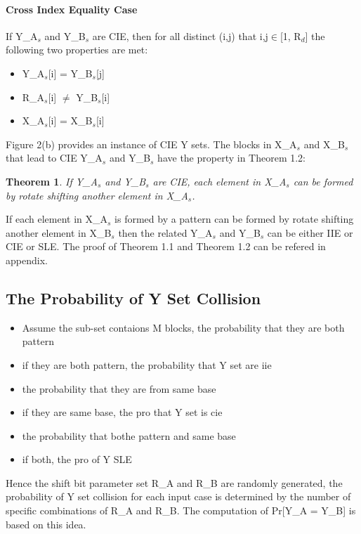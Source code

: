 \documentclass{article}
\newtheorem{theorem}{Theorem}[section]
\begin{document}
\paragraph{Cross Index Equality Case}
If Y\_A$_s$ and Y\_B$_s$ are CIE, then for all distinct (i,j) that i,j$\in$[1, R$_d$] the following two properties are met:
\begin{itemize}
	\item Y\_A$_s$[i] = Y\_B$_s$[j] 
	\item R\_A$_s$[i] $\neq$ Y\_B$_s$[i]
	\item X\_A$_s$[i] = X\_B$_s$[i]
\end{itemize}
Figure 2(b) provides an instance of CIE Y sets.
The blocks in X\_A$_s$ and X\_B$_s$ that lead to CIE Y\_A$_s$ and Y\_B$_s$ have the property in Theorem 1.2:
\begin{theorem}
If Y\_A$_s$ and Y\_B$_s$ are CIE, each element in X\_A$_s$ can be formed by rotate shifting another element in X\_A$_s$.
\end{theorem}

If each element in X\_A$_s$ is formed by a pattern can be formed by rotate shifting another element in X\_B$_s$ then the related Y\_A$_s$ and Y\_B$_s$ can be either IIE or CIE or SLE.
The proof of Theorem 1.1 and Theorem 1.2 can be refered in appendix.


\subsection{The Probability of Y Set Collision} 
\begin{itemize}
	\item Assume the sub-set contaions M blocks, the probability that they are both pattern 
	\item if they are both pattern, the probability that Y set are iie
	\item the probability that they are from same base
	\item if they are same base, the pro that Y set is cie
	\item the probability that bothe pattern and same base
	\item if both, the pro of Y SLE
\end{itemize}
Hence the shift bit parameter set R\_A and R\_B are randomly generated, the probability of Y set collision for each input case is determined by the number of specific combinations of R\_A and R\_B. The computation of Pr[Y\_A = Y\_B] is based on this idea.
\end{document}
